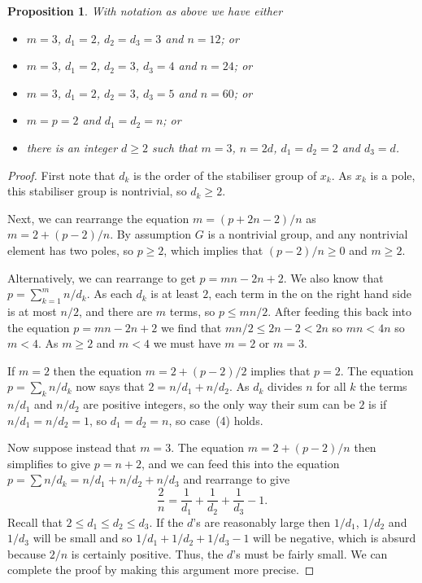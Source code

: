 \documentclass{amsart}
\renewcommand{\:}{\colon}
\newtheorem{proposition}[theorem]{Proposition}
\theoremstyle{definition}
\begin{document}
\begin{proposition}\label{prop-numbers}
 With notation as above we have either
 \begin{itemize}
 \item[(1)] $m=3$, $d_1=2$, $d_2=d_3=3$ and $n=12$; or
 \item[(2)] $m=3$, $d_1=2$, $d_2=3$, $d_3=4$ and $n=24$; or
 \item[(3)] $m=3$, $d_1=2$, $d_2=3$, $d_3=5$ and $n=60$; or
 \item[(4)] $m=p=2$ and $d_1=d_2=n$; or
 \item[(5)] there is an integer $d\geq 2$ such that $m=3$, $n=2d$,
  $d_1=d_2=2$ and $d_3=d$.
 \end{itemize}
\end{proposition}
\begin{proof}
 First note that $d_k$ is the order of the stabiliser group of $x_k$.
 As $x_k$ is a pole, this stabiliser group is nontrivial, so
 $d_k\geq 2$.

 Next, we can rearrange the equation $m=(p+2n-2)/n$ as $m=2+(p-2)/n$.
 By assumption $G$ is a nontrivial group, and any nontrivial element
 has two poles, so $p\geq 2$, which implies that $(p-2)/n\geq 0$ and
 $m\geq 2$.

 Alternatively, we can rearrange to get $p=mn-2n+2$.  We also know
 that $p=\sum_{k=1}^m n/d_k$.  As each $d_k$ is at least $2$, each
 term in the on the right hand side is at most $n/2$, and there are
 $m$ terms, so $p\leq mn/2$.  After feeding this back into the
 equation $p=mn-2n+2$ we find that $mn/2\leq 2n-2<2n$ so $mn<4n$ so
 $m<4$.  As $m\geq 2$ and $m<4$ we must have $m=2$ or $m=3$.

 If $m=2$ then the equation $m=2+(p-2)/2$ implies that $p=2$.  The
 equation $p=\sum_k n/d_k$ now says that $2=n/d_1+n/d_2$.  As $d_k$
 divides $n$ for all $k$ the terms $n/d_1$ and $n/d_2$ are positive
 integers, so the only way their sum can be $2$ is if $n/d_1=n/d_2=1$,
 so $d_1=d_2=n$, so case~(4) holds.

 Now suppose instead that $m=3$.  The equation $m=2+(p-2)/n$ then
 simplifies to give $p=n+2$, and we can feed this into the equation
 $p=\sum n/d_k=n/d_1+n/d_2+n/d_3$ and rearrange to give
 \[ \frac{2}{n} = \frac{1}{d_1} + \frac{1}{d_2} + \frac{1}{d_3} - 1.
 \]
 Recall that $2\leq d_1\leq d_2\leq d_3$.  If the $d$'s are reasonably
 large then $1/d_1$, $1/d_2$ and $1/d_3$ will be small and so
 $1/d_1+1/d_2+1/d_3-1$ will be negative, which is absurd because $2/n$
 is certainly positive.  Thus, the $d$'s must be fairly small.  We can
 complete the proof by making this argument more precise.


\end{proof}
\end{document}
